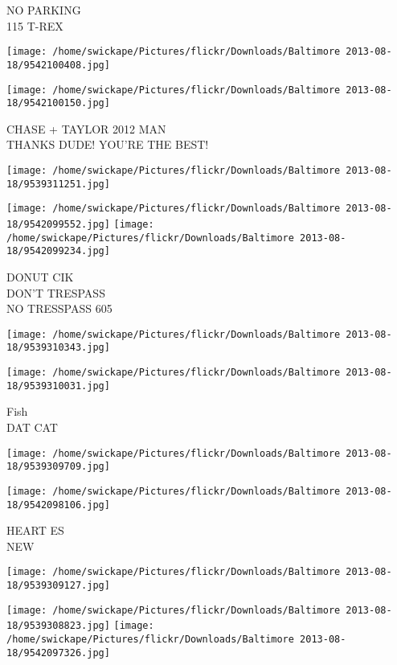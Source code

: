 \documentclass[10pt,letterpaper]{article}
\begin{document}
NO PARKING\\
115 T{-}REX
\pagebreak

\texttt{[image: /home/swickape/Pictures/flickr/Downloads/Baltimore 2013-08-18/9542100408.jpg]}

\vspace{0.25in}
\texttt{[image: /home/swickape/Pictures/flickr/Downloads/Baltimore 2013-08-18/9542100150.jpg]}

CHASE + TAYLOR 2012 MAN\\
THANKS DUDE! YOU'RE THE BEST!
\pagebreak

\texttt{[image: /home/swickape/Pictures/flickr/Downloads/Baltimore 2013-08-18/9539311251.jpg]}

\vspace{0.25in}
\texttt{[image: /home/swickape/Pictures/flickr/Downloads/Baltimore 2013-08-18/9542099552.jpg]}
\texttt{[image: /home/swickape/Pictures/flickr/Downloads/Baltimore 2013-08-18/9542099234.jpg]}

DONUT CIK\\
DON'T TRESPASS\\
NO TRESSPASS 605
\pagebreak

\texttt{[image: /home/swickape/Pictures/flickr/Downloads/Baltimore 2013-08-18/9539310343.jpg]}

\vspace{0.25in}
\texttt{[image: /home/swickape/Pictures/flickr/Downloads/Baltimore 2013-08-18/9539310031.jpg]}

Fish\\
DAT CAT
\pagebreak

\texttt{[image: /home/swickape/Pictures/flickr/Downloads/Baltimore 2013-08-18/9539309709.jpg]}

\vspace{0.25in}
\texttt{[image: /home/swickape/Pictures/flickr/Downloads/Baltimore 2013-08-18/9542098106.jpg]}

HEART ES\\
NEW
\pagebreak

\texttt{[image: /home/swickape/Pictures/flickr/Downloads/Baltimore 2013-08-18/9539309127.jpg]}

\vspace{0.25in}
\texttt{[image: /home/swickape/Pictures/flickr/Downloads/Baltimore 2013-08-18/9539308823.jpg]}
\texttt{[image: /home/swickape/Pictures/flickr/Downloads/Baltimore 2013-08-18/9542097326.jpg]}
\end{document}
